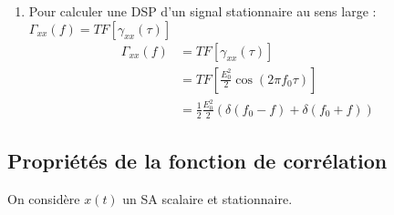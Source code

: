 \documentclass[main.tex]{subfiles}
\begin{document}
\begin{enumerate}
\item Pour calculer une DSP d'un signal stationnaire au sens large : $\Gamma_{xx}(f) = TF[\gamma_{xx}(\tau)]$
\begin{align*}
\Gamma_{xx}(f) & = TF[\gamma_{xx}(\tau)] \\
& = TF[\frac{E_0^2}{2}\cos(2\pi f_0 \tau) ] \\
& = \frac{1}{2} \frac{E_0^2}{2} (\delta(f_0-f) + \delta(f_0+f))
\end{align*} 

\end{enumerate}

\subsection*{Propriétés de la fonction de corrélation}

On considère $x(t)$ un SA scalaire et stationnaire.
\end{document}
